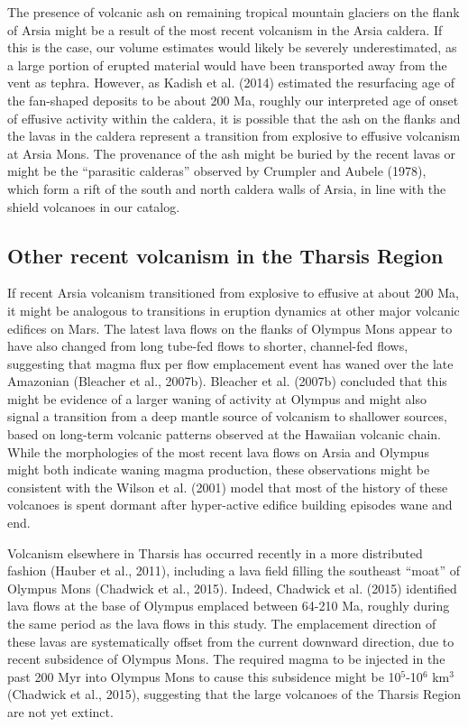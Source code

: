 \documentclass[12pt,letter]{article}
\begin{document}
The presence of volcanic ash on remaining tropical mountain glaciers on the flank of Arsia might be a result of the most recent volcanism in the Arsia caldera. If this is the case, our volume estimates would likely be severely underestimated, as a large portion of erupted material would have been transported away from the vent as tephra. However, as Kadish et al. (2014) estimated the resurfacing age of the fan-shaped deposits to be about 200 Ma, roughly our interpreted age of onset of effusive activity within the caldera, it is possible that the ash on the flanks and the lavas in the caldera represent a transition from explosive to effusive volcanism at Arsia Mons. The provenance of the ash might be buried by the recent lavas or might be the ``parasitic calderas'' observed by Crumpler and Aubele (1978), which form a rift of the south and north caldera walls of Arsia, in line with the shield volcanoes in our catalog.

\subsection{Other recent volcanism in the Tharsis Region}

If recent Arsia volcanism transitioned from explosive to effusive at about 200 Ma, it might be analogous to transitions in eruption dynamics at other major volcanic edifices on Mars. The latest lava flows on the flanks of Olympus Mons appear to have also changed from long tube-fed flows to shorter, channel-fed flows, suggesting that magma flux per flow emplacement event has waned over the late Amazonian (Bleacher et al., 2007b). Bleacher et al. (2007b) concluded that this might be evidence of a larger waning of activity at Olympus and might also signal a transition from a deep mantle source of volcanism to shallower sources, based on long-term volcanic patterns observed at the Hawaiian volcanic chain. While the morphologies of the most recent lava flows on Arsia and Olympus might both indicate waning magma production, these observations might be consistent with the Wilson et al. (2001) model that most of the history of these volcanoes is spent dormant after hyper-active edifice building episodes wane and end.

Volcanism elsewhere in Tharsis has occurred recently in a more distributed fashion (Hauber et al., 2011), including a lava field filling the southeast ``moat'' of Olympus Mons (Chadwick et al., 2015). Indeed, Chadwick et al. (2015) identified lava flows at the base of Olympus emplaced between 64-210 Ma, roughly during the same period as the lava flows in this study. The emplacement direction of these lavas are systematically offset from the current downward direction, due to recent subsidence of Olympus Mons. The required magma to be injected in the past 200 Myr into Olympus Mons to cause this subsidence might be 10$^5$-10$^6$ km$^3$ (Chadwick et al., 2015), suggesting that the large volcanoes of the Tharsis Region are not yet extinct.



\end{document}
